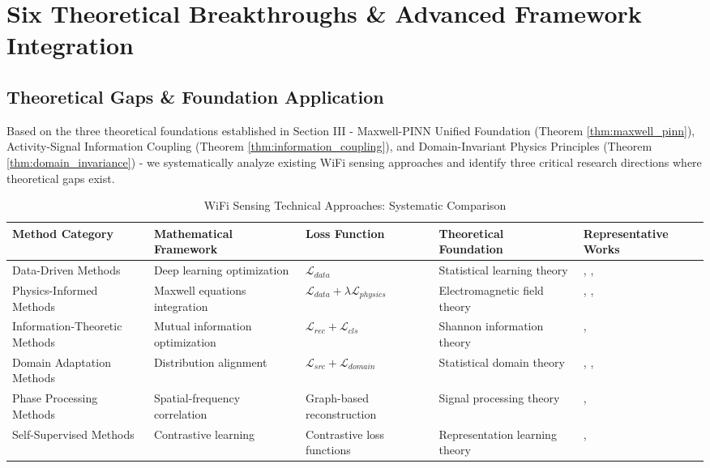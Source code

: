 \documentclass[journal]{IEEEtran}
\begin{document}
\section{Six Theoretical Breakthroughs \& Advanced Framework Integration}
\label{sec:six_breakthroughs}

\subsection{Theoretical Gaps \& Foundation Application}

Based on the three theoretical foundations established in Section III - Maxwell-PINN Unified Foundation (Theorem \ref{thm:maxwell_pinn}), Activity-Signal Information Coupling (Theorem \ref{thm:information_coupling}), and Domain-Invariant Physics Principles (Theorem \ref{thm:domain_invariance}) - we systematically analyze existing WiFi sensing approaches and identify three critical research directions where theoretical gaps exist.

\begin{table*}[h]
\centering
\caption{WiFi Sensing Technical Approaches: Systematic Comparison}
\label{tab:method_comparison}
\begin{tabular}{|p{1.8cm}|p{2.2cm}|p{2.2cm}|p{2.2cm}|p{3cm}|}
\hline
\textbf{Method Category} & \textbf{Mathematical Framework} & \textbf{Loss Function} & \textbf{Theoretical Foundation} & \textbf{Representative Works} \\
\hline
Data-Driven Methods & Deep learning optimization & $\mathcal{L}_{data}$ & Statistical learning theory & \cite{chen2018wifi}, \cite{batool2024ensemble}, \cite{abuhoureyah2024wifi} \\
\hline
Physics-Informed Methods & Maxwell equations integration & $\mathcal{L}_{data} + \lambda \mathcal{L}_{physics}$ & Electromagnetic field theory & \cite{raissi2019physics}, \cite{luo2025physics}, \cite{olivares2021applications} \\
\hline
Information-Theoretic Methods & Mutual information optimization & $\mathcal{L}_{rec} + \mathcal{L}_{cls}$ & Shannon information theory & \cite{chen2024efficientfi}, \cite{cover1999elements} \\
\hline
Domain Adaptation Methods & Distribution alignment & $\mathcal{L}_{src} + \mathcal{L}_{domain}$ & Statistical domain theory & \cite{wang2022airfi}, \cite{bu2022deep}, \cite{liu2023wisr} \\
\hline
Phase Processing Methods & Spatial-frequency correlation & Graph-based reconstruction & Signal processing theory & \cite{chen2024wiphase}, \cite{meneghello2022sharp} \\
\hline
Self-Supervised Methods & Contrastive learning & Contrastive loss functions & Representation learning theory & \cite{radwan2025tutorial}, \cite{xu2025evaluating} \\
\hline
\end{tabular}
\end{table*}
\end{document}
